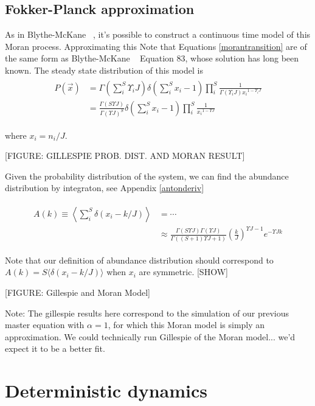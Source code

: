 \documentclass[11pt,a4paper,final]{iopart}
\begin{document}
\subsection{Fokker-Planck approximation}

As in Blythe-McKane ~\cite{Blythe2007}, it's possible to construct a continuous time model of this Moran process.
Approximating this 
Note that Equations \ref{morantransition} are of the same form as Blythe-McKane ~\cite{Blythe2007} Equation 83, whose solution has long been known.
The steady state distribution of this model is
\begin{align}
\begin{split}
P(\vec{x}) &= \Gamma (\sum_i^S \Upsilon_i J) \delta(\sum_i^S x_i -1) \prod_{i}^S \frac{1}{\Gamma (\Upsilon_i J){x_i}^{1-\Upsilon_i J}} \\
&= \frac{\Gamma (S \Upsilon J)}{\Gamma (\Upsilon J)^S} \delta(\sum_i^S x_i -1) \prod_{i}^S \frac{1}{{x_i}^{1-\Upsilon J}}
\end{split}
\end{align}

where $x_i=n_i/J$.

[FIGURE: GILLESPIE PROB. DIST. AND MORAN RESULT]

Given the probability distribution of the system, we can find the abundance distribution by integraton, see Appendix \ref{antonderiv}

\begin{align}
\begin{split}
A(k) \equiv \left\langle \sum_i^S \delta(x_i-k/J) \right\rangle &= \cdots \\
&\approx \frac{\Gamma (S \Upsilon J) \Gamma (\Upsilon J)}{\Gamma ((S+1)\Upsilon J + 1)}\left(\frac{k}{J}\right)^{\Upsilon J - 1} e^{-\Upsilon J k}
\end{split}
\end{align}

Note that our definition of abundance distribution should correspond to $A(k)=S\langle \delta(x_i-k/J) \rangle$ when $x_i$ are symmetric. [SHOW]

[FIGURE: Gillespie and Moran Model]

Note: The gillespie results here correspond to the simulation of our previous master equation with $\alpha = 1$, for which this Moran model is simply an approximation. We could technically run Gillespie of the Moran model... we'd expect it to be a better fit.

\section{Deterministic dynamics}
\end{document}
